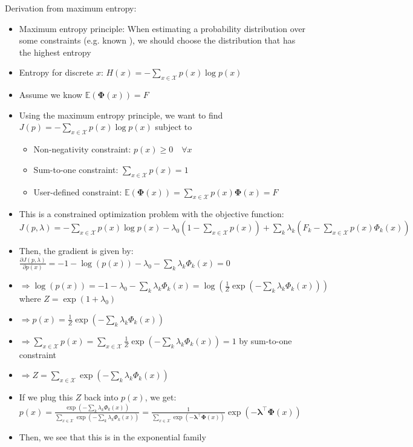 Derivation from maximum entropy:
\begin{itemize}
    \item Maximum entropy principle: When estimating a probability distribution over some constraints (e.g. known ), we should choose the distribution that has the highest entropy
    \item Entropy for discrete $x$:
    $
    H(x) = -\sum_{x \in \mathcal{X}} p(x) \log p(x)
    $
    \item Assume we know $\mathbb{E}(\boldsymbol{\Phi}(x)) = F$
    \item Using the maximum entropy principle, we want to find $J(p) = -\sum_{x \in \mathcal{X}} p(x) \log p(x)$ subject to
    \begin{itemize}
        \item Non-negativity constraint: $p(x) \geq 0 \quad \forall x$
        \item Sum-to-one constraint: $\sum_{x \in \mathcal{X}} p(x) = 1$
        \item User-defined constraint: $\mathbb{E}(\boldsymbol{\Phi}(x)) = \sum_{x \in \mathcal{X}} p(x) \boldsymbol{\Phi}(x) = F$
    \end{itemize}
    \item This is a constrained optimization problem with the objective function: $
    J(p, \lambda) = -\sum_{x \in \mathcal{X}} p(x) \log p(x) - \lambda_0 \left(1 - \sum_{x \in \mathcal{X}} p(x)\right) + \sum_k \lambda_k \left(F_k - \sum_{x \in \mathcal{X}} p(x) \Phi_k(x)\right)
    $
    \item Then, the gradient is given by:
    $
    \frac{\partial J(p, \lambda)}{\partial p(x)} = -1 - \log(p(x)) - \lambda_0 - \sum_k \lambda_k \Phi_k(x) = 0
    $
    \item $\Rightarrow \log(p(x)) = -1 - \lambda_0 - \sum_k \lambda_k \Phi_k(x) = \log(\frac{1}{Z} \exp\left(-\sum_k \lambda_k \Phi_k(x)\right))$ where $Z = \exp(1 + \lambda_0)$
    \item $\Rightarrow p(x) = \frac{1}{Z} \exp\left(-\sum_k \lambda_k \Phi_k(x)\right)$
    \item $\Rightarrow
    \sum_{x \in \mathcal{X}} p(x) = \sum_{x \in \mathcal{X}} \frac{1}{Z} \exp\left(-\sum_k \lambda_k \Phi_k(x)\right) = 1
    $ by sum-to-one constraint
    \item $\Rightarrow
    Z = \sum_{x \in \mathcal{X}} \exp\left(-\sum_k \lambda_k \Phi_k(x)\right)$
    \item If we plug this $Z$ back into $p(x)$, we get:
    $
    p(x) = \frac{\exp\left(-\sum_k \lambda_k \Phi_k(x)\right)}{\sum_{x \in \mathcal{X}} \exp\left(-\sum_k \lambda_k \Phi_k(x)\right)} = \frac{1}{\sum_{x \in \mathcal{X}} \exp\left(-\boldsymbol{\lambda}^\intercal \boldsymbol{\Phi}(x)\right)} \exp\left(-\boldsymbol{\lambda}^\intercal \boldsymbol{\Phi}(x)\right)
    $
    \item Then, we see that this is in the exponential family
\end{itemize}
